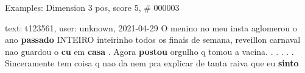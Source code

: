 \begin{frame}{Examples: Dimension 3 pos, score 5, \# 000003}
\footnotesize
\begin{exampleblock}{text: t123561, user: unknown, 2021-04-29}
O menino no meu insta aglomerou o ano \textbf{passado} INTEIRO inteirinho todos 
os finais de semana, reveillon carnaval nao guardou o \textbf{cu} em 
\textbf{casa} . Agora \textbf{postou} orgulho q tomou a vacina. . . . . . 
Sinceramente tem coisa q nao da nem pra explicar de tanta raiva que eu 
\textbf{sinto} 
\end{exampleblock}
\end{frame}
